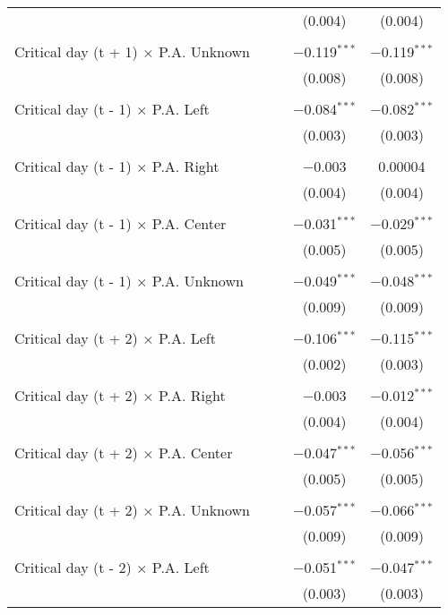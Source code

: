 \documentclass[
]{article}
\begin{document}
\begin{table}[!htbp]
{\begin{tabular}{@{\extracolsep{5pt}}lcccc}
  &  &  & (0.004) & (0.004) \\ 
  & & & & \\ 
 Critical day (t + 1) $\times$ P.A. Unknown &  &  & $-$0.119$^{***}$ & $-$0.119$^{***}$ \\ 
  &  &  & (0.008) & (0.008) \\ 
  & & & & \\ 
 Critical day (t - 1) $\times$ P.A. Left &  &  & $-$0.084$^{***}$ & $-$0.082$^{***}$ \\ 
  &  &  & (0.003) & (0.003) \\ 
  & & & & \\ 
 Critical day (t - 1) $\times$ P.A. Right &  &  & $-$0.003 & 0.00004 \\ 
  &  &  & (0.004) & (0.004) \\ 
  & & & & \\ 
 Critical day (t - 1) $\times$ P.A. Center &  &  & $-$0.031$^{***}$ & $-$0.029$^{***}$ \\ 
  &  &  & (0.005) & (0.005) \\ 
  & & & & \\ 
 Critical day (t - 1) $\times$ P.A. Unknown &  &  & $-$0.049$^{***}$ & $-$0.048$^{***}$ \\ 
  &  &  & (0.009) & (0.009) \\ 
  & & & & \\ 
 Critical day (t + 2) $\times$ P.A. Left &  &  & $-$0.106$^{***}$ & $-$0.115$^{***}$ \\ 
  &  &  & (0.002) & (0.003) \\ 
  & & & & \\ 
 Critical day (t + 2) $\times$ P.A. Right &  &  & $-$0.003 & $-$0.012$^{***}$ \\ 
  &  &  & (0.004) & (0.004) \\ 
  & & & & \\ 
 Critical day (t + 2) $\times$ P.A. Center &  &  & $-$0.047$^{***}$ & $-$0.056$^{***}$ \\ 
  &  &  & (0.005) & (0.005) \\ 
  & & & & \\ 
 Critical day (t + 2) $\times$ P.A. Unknown &  &  & $-$0.057$^{***}$ & $-$0.066$^{***}$ \\ 
  &  &  & (0.009) & (0.009) \\ 
  & & & & \\ 
 Critical day (t - 2) $\times$ P.A. Left &  &  & $-$0.051$^{***}$ & $-$0.047$^{***}$ \\ 
  &  &  & (0.003) & (0.003) \\ 

\end{tabular}}
\end{table}
\end{document}
